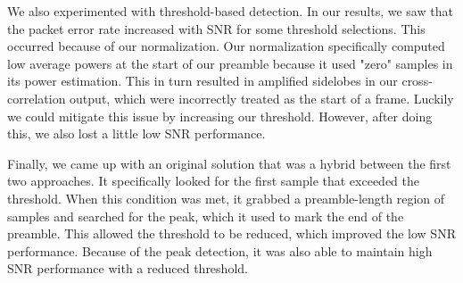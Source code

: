 \documentclass{article}
\begin{document}
We also experimented with threshold-based detection. In our results, we saw that the packet error rate increased with SNR for some threshold selections. This occurred because of our normalization. Our normalization specifically computed low average powers at the start of our preamble because it used "zero" samples in its power estimation. This in turn resulted in amplified sidelobes in our cross-correlation output, which were incorrectly treated as the start of a frame. Luckily we could mitigate this issue by increasing our threshold. However, after doing this, we also lost a little low SNR performance.

Finally, we came up with an original solution that was a hybrid between the first two approaches. It specifically looked for the first sample that exceeded the threshold. When this condition was met, it grabbed a preamble-length region of samples and searched for the peak, which it used to mark the end of the preamble. This allowed the threshold to be reduced, which improved the low SNR performance. Because of the peak detection, it was also able to maintain high SNR performance with a reduced threshold.


{}
\end{document}

